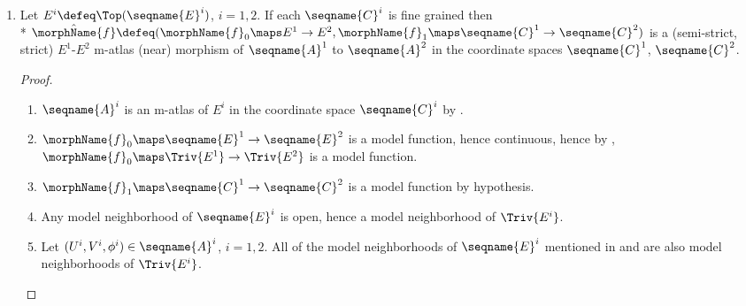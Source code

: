 \documentclass{article}
\begin{document}
\begin{lemma}
\begin{enumerate}
\begin{proof}
\end{proof}

\item
\label{M-ATLmorph:fineistopmorph}
Let $E^i \defeq \Top(\seqname{E}^i)$, $i=1,2$. If each $\seqname{C}^i$
is fine grained then \\*
$
   \hat{\morphName{f}} \defeq
   (
      \morphName{f}_0 \maps E^1 \to E^2,
      \morphName{f}_1 \maps \seqname{C}^1 \to \seqname{C}^2
   )
$
is a (semi-strict, strict) $E^1$-$E^2$
m-atlas (near) morphism of $\seqname{A}^1$ to $\seqname{A}^2$ in the
coordinate spaces $\seqname{C}^1$, $\seqname{C}^2$.

\begin{proof}
\leavevmode
\begin{enumerate}
\item
$\seqname{A}^i$ is an m-atlas of $E^i$ in the coordinate space
$\seqname{C}^i$ by .

\item
$\morphName{f}_0 \maps \seqname{E}^1 \to \seqname{E}^2$ is a model
function, hence continuous, hence by ,
$\morphName{f}_0 \maps \Triv{E^1} \to \Triv{E^2}$ is a model function.

\item
$\morphName{f}_1 \maps \seqname{C}^1 \to \seqname{C}^2$ is a model
function by hypothesis.

\item
Any model neighborhood of $\seqname{E}^i$ is open, hence a model
neighborhood of $\Triv{E^i}$.

\item
Let $(U^i,V^i,\phi^i) \in \seqname{A}^i$, $i=1,2$.  All of the model
neighborhoods of $\seqname{E}^i$ mentioned in
 and  are also
model neighborhoods of $\Triv{E^i}$.
\end{enumerate}
\end{proof}


\end{enumerate}
\end{lemma}
\end{document}
